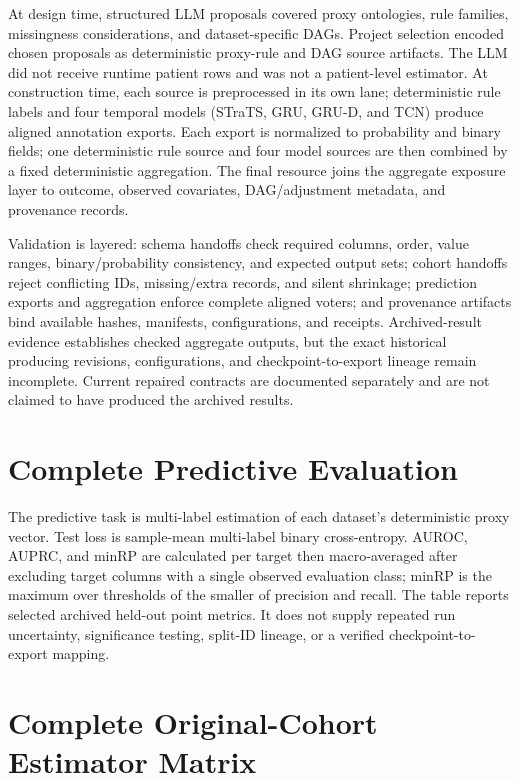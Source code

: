 \documentclass[letterpaper,10pt]{article}
\begin{document}
At design time, structured LLM proposals covered proxy ontologies, rule
families, missingness considerations, and dataset-specific DAGs.  Project
selection encoded chosen proposals as deterministic proxy-rule and DAG source
artifacts.  The LLM did not receive runtime patient rows and was not a
patient-level estimator.  At construction time, each source is preprocessed in
its own lane; deterministic rule labels and four temporal models (STraTS, GRU,
GRU-D, and TCN) produce aligned annotation exports.  Each export is normalized
to probability and binary fields; one deterministic rule source and four model
sources are then combined by a fixed deterministic aggregation.  The final
resource joins the aggregate exposure layer to outcome, observed covariates,
DAG/adjustment metadata, and provenance records.

Validation is layered: schema handoffs check required columns, order, value
ranges, binary/probability consistency, and expected output sets; cohort
handoffs reject conflicting IDs, missing/extra records, and silent shrinkage;
prediction exports and aggregation enforce complete aligned voters; and
provenance artifacts bind available hashes, manifests, configurations, and
receipts.  Archived-result evidence establishes checked aggregate outputs, but
the exact historical producing revisions, configurations, and
checkpoint-to-export lineage remain incomplete.  Current repaired contracts are
documented separately and are not claimed to have produced the archived results.

\section{Complete Predictive Evaluation}

The predictive task is multi-label estimation of each dataset's deterministic
proxy vector.  Test loss is sample-mean multi-label binary cross-entropy.
AUROC, AUPRC, and minRP are calculated per target then macro-averaged after
excluding target columns with a single observed evaluation class; minRP is the
maximum over thresholds of the smaller of precision and recall.  The table
reports selected archived held-out point metrics.  It does not supply repeated
run uncertainty, significance testing, split-ID lineage, or a verified
checkpoint-to-export mapping.



\section{Complete Original-Cohort Estimator Matrix}
\end{document}

